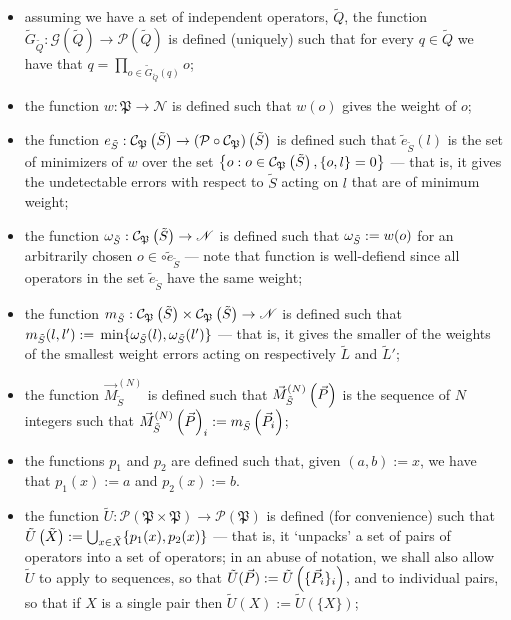 \documentclass[twocolumn,showpacs,preprintnumbers,amsmath,amssymb,nofootinbib,pra,floatfix]{revtex4-1}
\newenvironment{definition}[1][Definition]{\begin{trivlist}
\item[\hskip \labelsep {\bfseries #1}]}{\end{trivlist}}
\newcommand{\lst}{\vec}
\newcommand{\set}{\tilde}
\newcommand{\genfun}{\mathcal{G}}
\newcommand{\pauligroup}{\mathfrak{P}}
\newcommand{\powerset}{\mathcal{P}}
\newcommand{\centralizer}{\mathcal{C}}
\begin{document}
\begin{definition}
$\quad$

\begin{itemize}
\item assuming we have a set of independent operators, $\set Q$, the function $\set G_{\set Q}:\genfun(\set Q)\to\powerset(\set Q)$ is defined (uniquely) such that for every $q\in\set Q$ we have that $q=\prod_{o\in\set G_{\set Q}(q)} o$;
\item the function $w:\pauligroup\to \mathscr{N}$ is defined such that $w(o)$ gives the weight of $o$;
\item the function $e_{\set S}:\centralizer_\pauligroup\paren{\set S}\to \paren{\powerset\circ\centralizer_\pauligroup}\paren{\set S}$ is defined such that $\set e_{\set S}(l)$ is the set of minimizers of $w$ over the set $\left\{o: o\in \centralizer_\pauligroup\paren{\set S}, \{o,l\}=0\right\}$ --- that is, it gives the undetectable errors with respect to $\set S$ acting on $l$ that are of minimum weight;
\item the function $\om_{\set S}:\centralizer_\pauligroup\paren{\set S}\to\mathscr{N}$ is defined such that $\om_{\set S}:=w(o)$ for an arbitrarily chosen $o\in\circ \set e_{\set S}$ --- note that function is well-defiend since all operators in the set $\set e_{\set S}$ have the same weight;
\item the function $m_{\set S}:\centralizer_\pauligroup\paren{\set S}\times \centralizer_\pauligroup\paren{\set S} \to \mathscr{N}$ is defined such that $m_{\set S}(l,l'):=\min \{\om_{\set S}(l),\om_{\set S}(l')\}$ --- that is, it gives the smaller of the weights of the smallest weight errors acting on respectively $\set L$ and $\set L'$;
\item the function $\vec M^{(N)}_{\set S}$ is defined such that $\vec M^{(N)}_{\set S}\paren{\vec P}$ is the sequence of $N$ integers such that $\vec M^{(N)}_{\set S}\paren{\vec P}_i := m_{\set S}\paren{\vec P_i}$;
\item the functions $p_1$ and $p_2$ are defined such that, given $(a,b):=x$, we have that $p_1(x):=a$ and $p_2(x):=b$.
\item the function $\set U:\powerset(\pauligroup\times\pauligroup)\to\powerset(\pauligroup)$ is defined (for convenience) such that $\set U\paren{\set X}:=\bigcup_{x\in\set X} \{p_1(x),p_2(x)\}$ --- that is, it `unpacks' a set of pairs of operators into a set of operators;  in an abuse of notation, we shall also allow $\set U$ to apply to sequences, so that $\set U(\lst P) := \set U\paren{\{\lst P_i\}_i}$, and to individual pairs, so that if $X$ is a single pair then $\set U(X) := \set U(\{X\})$;

\end{itemize}
\end{definition}
\end{document}
